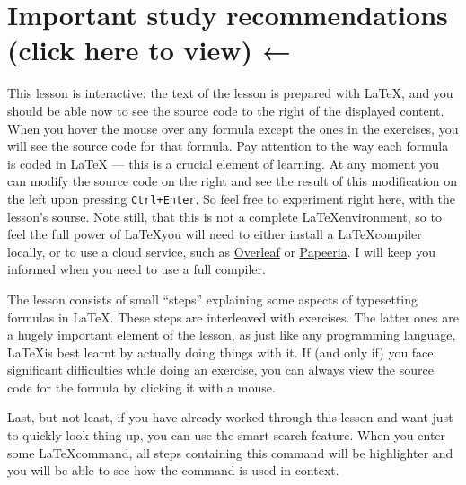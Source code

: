\section{Important study recommendations (click here to view) ←}
\par This lesson is interactive: the text of the lesson is prepared with \LaTeX, and you should be able now to see the source code to the right of the displayed content. When you hover the mouse over any formula except the ones in the exercises, you will see the source code for that formula. Pay attention to the way each formula is coded in LaTeX — this is a crucial element of learning. At any moment you can modify the source code on the right and see the result of this modification on the left upon pressing \verb"Ctrl+Enter". So feel free to experiment right here, with the lesson’s sourse. Note still, that this is not a complete \LaTeX environment, so to feel the full power of \LaTeX you will need to either install a \LaTeX compiler locally, or to use a cloud service, such as \href{https://www.overleaf.com/}{Overleaf} or \href{https://papeeria.com/landing}{Papeeria}. I will keep you informed when you need to use a full compiler.
\par The lesson consists of small “steps” explaining some aspects of typesetting formulas in \LaTeX. These steps are interleaved with exercises. The latter ones are a hugely important element of the lesson, as just like any programming language, \LaTeX is best learnt by actually doing things with it. If (and only if) you face significant difficulties while doing an exercise, you can always view the source code for the formula by clicking it with a mouse.
\par Last, but not least, if you have already worked through this lesson and want just to quickly look thing up, you can use the smart search feature. When you enter some \LaTeX command, all steps containing this command will be highlighter and you will be able to see how the command is used in context.